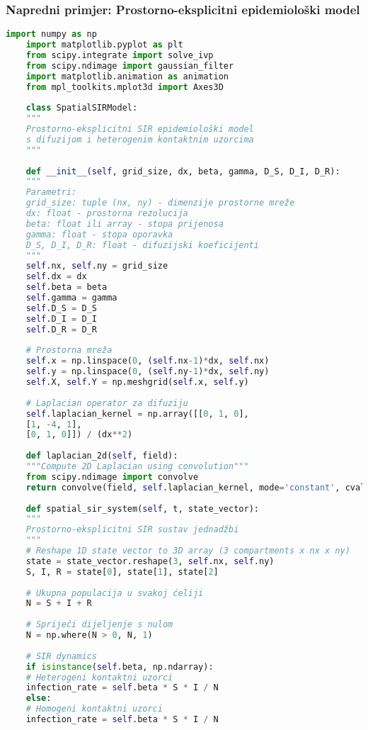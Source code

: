 \documentclass[11pt,oneside]{book}
\begin{document}
\subsubsection{Napredni primjer: Prostorno-eksplicitni epidemiološki model}

\begin{lstlisting}[language=Python, caption=SIR model s prostornom difuzijom]
	import numpy as np
	import matplotlib.pyplot as plt
	from scipy.integrate import solve_ivp
	from scipy.ndimage import gaussian_filter
	import matplotlib.animation as animation
	from mpl_toolkits.mplot3d import Axes3D
	
	class SpatialSIRModel:
	"""
	Prostorno-eksplicitni SIR epidemiološki model
	s difuzijom i heterogenim kontaktnim uzorcima
	"""
	
	def __init__(self, grid_size, dx, beta, gamma, D_S, D_I, D_R):
	"""
	Parametri:
	grid_size: tuple (nx, ny) - dimenzije prostorne mreže
	dx: float - prostorna rezolucija
	beta: float ili array - stopa prijenosa
	gamma: float - stopa oporavka
	D_S, D_I, D_R: float - difuzijski koeficijenti
	"""
	self.nx, self.ny = grid_size
	self.dx = dx
	self.beta = beta
	self.gamma = gamma
	self.D_S = D_S
	self.D_I = D_I
	self.D_R = D_R
	
	# Prostorna mreža
	self.x = np.linspace(0, (self.nx-1)*dx, self.nx)
	self.y = np.linspace(0, (self.ny-1)*dx, self.ny)
	self.X, self.Y = np.meshgrid(self.x, self.y)
	
	# Laplacian operator za difuziju
	self.laplacian_kernel = np.array([[0, 1, 0],
	[1, -4, 1],
	[0, 1, 0]]) / (dx**2)
	
	def laplacian_2d(self, field):
	"""Compute 2D Laplacian using convolution"""
	from scipy.ndimage import convolve
	return convolve(field, self.laplacian_kernel, mode='constant', cval=0)
	
	def spatial_sir_system(self, t, state_vector):
	"""
	Prostorno-eksplicitni SIR sustav jednadžbi
	"""
	# Reshape 1D state vector to 3D array (3 compartments x nx x ny)
	state = state_vector.reshape(3, self.nx, self.ny)
	S, I, R = state[0], state[1], state[2]
	
	# Ukupna populacija u svakoj ćeliji
	N = S + I + R
	
	# Spriječi dijeljenje s nulom
	N = np.where(N > 0, N, 1)
	
	# SIR dynamics
	if isinstance(self.beta, np.ndarray):
	# Heterogeni kontaktni uzorci
	infection_rate = self.beta * S * I / N
	else:
	# Homogeni kontaktni uzorci
	infection_rate = self.beta * S * I / N
	

\end{lstlisting}
\end{document}
